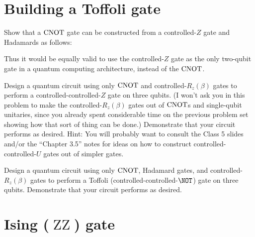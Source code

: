 \documentclass{../phys084}
\author{}
\date{2020 February 18}
\DeclareMathOperator{\ising}{ZZ}
\begin{document}
\section{Building a Toffoli gate}
\begin{exercise}
  \begin{problems}
  \item Show that a \(\operatorname{CNOT}\) gate can be constructed from a
    controlled-\(Z\) gate and Hadamards as follows:
    \begin{center}
    \end{center}

    Thus it would be equally valid to use the controlled-\(Z\) gate as
    the only two-qubit gate in a quantum computing architecture,
    instead of the \(\operatorname{CNOT}\).

  \item Design a quantum circuit using only \(\operatorname{CNOT}\) and
    controlled-\(R_z(\beta)\) gates to perform a
    controlled-controlled-\(Z\) gate on three qubits.  (I won't ask
    you in this problem to make the controlled-\(R_z(\beta)\) gates
    out of \(\operatorname{CNOT}\)s and single-qubit unitaries, since you already
    spent considerable time on the previous problem set showing how
    that sort of thing can be done.)  Demonstrate that your circuit
    performs as desired.  Hint: You will probably want to consult the
    Class 5 slides and/or the ``Chapter 3.5'' notes for ideas on how
    to construct controlled-controlled-\(U\) gates out of simpler
    gates.

  \item Design a quantum circuit using only \(\operatorname{CNOT}\), Hadamard gates,
    and controlled-\(R_z(\beta)\) gates to perform a Toffoli
    (controlled-controlled-\(\NOT\)) gate on three qubits.
    Demonstrate that your circuit performs as desired.
  \end{problems}
\end{exercise}

\begin{solution}
  \begin{problems}
  \item
  \item
  \item
  \end{problems}
\end{solution}

\section{Ising (\(\ising\)) gate}
\end{document}
